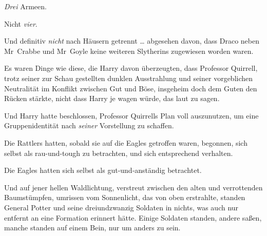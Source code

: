 \emph{Drei} Armeen.

Nicht \emph{vier}.

Und definitiv \emph{nicht} nach Häusern getrennt … abgesehen davon, dass Draco neben Mr~Crabbe und Mr~Goyle keine weiteren Slytherins zugewiesen worden waren.

Es waren Dinge wie diese, die Harry davon überzeugten, dass Professor Quirrell, trotz seiner zur Schau gestellten dunklen Ausstrahlung und seiner vorgeblichen Neutralität im Konflikt zwischen Gut und Böse, insgeheim doch dem Guten den Rücken stärkte, nicht dass Harry je wagen würde, das laut zu sagen.

Und Harry hatte beschlossen, Professor Quirrells Plan voll auszunutzen, um eine Gruppenidentität nach \emph{seiner} Vorstellung zu schaffen.

Die Rattlers hatten, sobald sie auf die Eagles getroffen waren, begonnen, sich selbst als rau-und-tough zu betrachten, und sich entsprechend verhalten.

Die Eagles hatten sich selbst als gut-und-anständig betrachtet.

Und auf jener hellen Waldlichtung, verstreut zwischen den alten und verrottenden Baumstümpfen, umrissen vom Sonnenlicht, das von oben erstrahlte, standen General Potter und seine dreiundzwanzig Soldaten in nichts, was auch nur entfernt an eine Formation erinnert hätte. Einige Soldaten standen, andere saßen, manche standen auf einem Bein, nur um anders zu sein.

